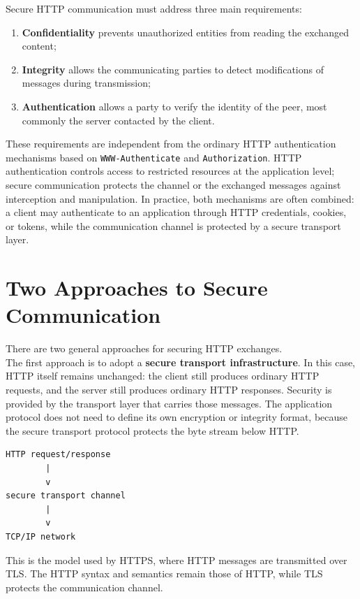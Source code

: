 \documentclass{scrbook}
\begin{document}
Secure HTTP communication must address three main requirements:
\begin{enumerate}
	\item \textbf{Confidentiality} prevents unauthorized entities from reading the exchanged content;
	\item \textbf{Integrity} allows the communicating parties to detect modifications of messages during transmission;
	\item \textbf{Authentication} allows a party to verify the identity of the peer, most commonly the server contacted by the client.
\end{enumerate}

These requirements are independent from the ordinary HTTP authentication mechanisms based on \texttt{WWW-Authenticate} and \texttt{Authorization}. HTTP authentication controls access to restricted resources at the application level; secure communication protects the channel or the exchanged messages against interception and manipulation. In practice, both mechanisms are often combined: a client may authenticate to an application through HTTP credentials, cookies, or tokens, while the communication channel is protected by a secure transport layer.

\section{Two Approaches to Secure Communication}

There are two general approaches for securing HTTP exchanges.\\

The first approach is to adopt a \textbf{secure transport infrastructure}. In this case, HTTP itself remains unchanged: the client still produces ordinary HTTP requests, and the server still produces ordinary HTTP responses. Security is provided by the transport layer that carries those messages. The application protocol does not need to define its own encryption or integrity format, because the secure transport protocol protects the byte stream below HTTP.

\begin{lstlisting}
HTTP request/response
        |
        v
secure transport channel
        |
        v
TCP/IP network
\end{lstlisting}

This is the model used by HTTPS, where HTTP messages are transmitted over TLS. The HTTP syntax and semantics remain those of HTTP, while TLS protects the communication channel.\\
\end{document}
